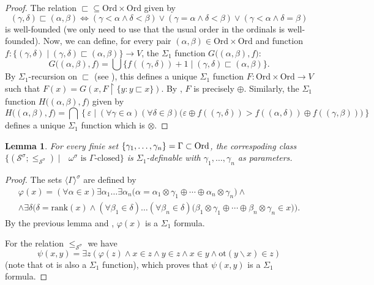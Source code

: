 \documentclass[reqno]{amsart}
\newtheorem{lemma}[theorem]{Lemma}
\theoremstyle{definition}
\theoremstyle{definition}
\theoremstyle{plain} %
\begin{document}
\begin{proof}
The relation $\sqsubset\subseteq\text{Ord}\times\text{Ord}$ given by $$(\gamma,\delta)\sqsubset(\alpha,\beta)\iff (\gamma<\alpha\wedge\delta<\beta)\vee(\gamma=\alpha\wedge\delta<\beta)\vee(\gamma<\alpha\wedge\delta=\beta) $$is well-founded (we only need to use that the usual order in the ordinals is well-founded). Now, we can define, for every pair $(\alpha,\beta)\in\text{Ord}\times\text{Ord}$ and function $f:\{(\gamma,\delta) \mid (\gamma,\delta)\sqsubset(\alpha,\beta)\}\to V$, the $\Sigma_1$ function $G\big((\alpha,\beta),f\big)$: $$G\big((\alpha,\beta),f\big)=\bigcup\{f((\gamma,\delta))+1 \mid (\gamma,\delta)\sqsubset (\alpha,\beta)\}.$$ By $\Sigma_1$-recursion on $\sqsubset$ (see \cite[Theorem 3.1]{drake1974set}), this defines a unique $\Sigma_1$ function $F:\text{Ord}\times\text{Ord}\to V$ such that $F(x)=G(x,F\upharpoonright\{y:y\sqsubset x\})$. By \cite[Theorem 2.4]{altman}, $F$ is precisely $\oplus$. Similarly, the $\Sigma_1$ function $H\big((\alpha,\beta),f\big)$ given by $$H\big((\alpha,\beta),f\big)=\bigcap\left\{\varepsilon \mid (\forall \gamma\in\alpha)(\forall \delta\in\beta)\big( \varepsilon\oplus f((\gamma,\delta))>f((\alpha,\delta))\oplus f((\gamma,\beta))\big)\right\} $$defines a unique $\Sigma_1$ function which is $\otimes$.
\end{proof}

\begin{lemma}\label{lemmadef}
    For every finie set $\{\gamma_1,\dots,\gamma_n\}=\Gamma\subset\textnormal{Ord}$, the correspoding class $\{ (\mathcal{S}^\sigma;\leq_{\mathcal{S}^\sigma}) \mid\text{ $\omega^\sigma$ is $\Gamma$-closed} \}$ is $\Sigma_1$-definable with $\gamma_1,\dots,\gamma_n$ as parameters.
\end{lemma}\begin{proof} The sets $\langle\Gamma\rangle^\sigma$ are defined by
    \begin{gather*}
    \varphi(x)=(\forall \alpha\in x)\exists\alpha_1\dots\exists\alpha_n\big( \alpha=\alpha_1\otimes\gamma_1\oplus\cdots\oplus\alpha_n\otimes\gamma_n \big) \wedge\\\wedge\exists \delta\Big(\delta=\text{rank}(x)\wedge(\forall \beta_1\in\delta)\dots(\forall \beta_n\in\delta)\big(\beta_1\otimes\gamma_1\oplus\cdots\oplus\beta_n\otimes\gamma_n\in x\big)\Big).
\end{gather*} By the previous lemma and \cite[Corollary 3.2]{drake1974set}, $\varphi(x)$ is a $\Sigma_1$ formula.

For the relation $\leq_{\mathcal{S}^\sigma}$ we have $$\psi(x,y)=\exists z(\varphi(z)\wedge x\in z\wedge y\in z\wedge x\in y\wedge\text{ot}(y\backslash x)\in z)$$ (note that $\text{ot}$ is also a $\Sigma_1$ function), which proves that $\psi(x,y)$ is a $\Sigma_1$ formula.
\end{proof}
\end{document}
